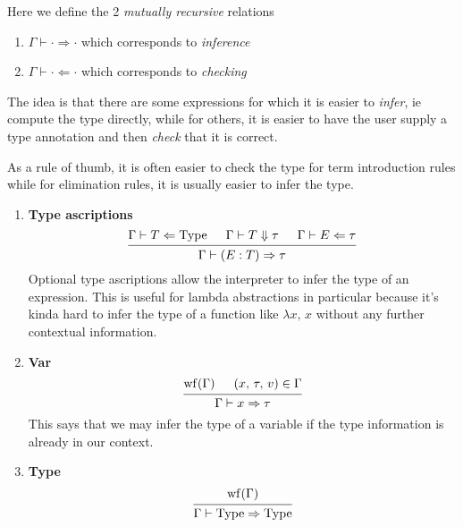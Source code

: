 \documentclass{article}
\begin{document}
\begin{definition} 
  Here we define the 2 \textit{mutually recursive} relations
  \begin{enumerate}
  \item$\Gamma \vdash \cdot \Rightarrow \cdot $ which corresponds to \textit{inference}
  \item$\Gamma \vdash \cdot \Leftarrow \cdot$ which corresponds to \textit{checking}
  \end{enumerate}

  The idea is that there are some expressions for which it is easier to
  \textit{infer},
  ie compute the type directly, while for others, it is easier to have the user
  supply a type annotation and then \textit{check} that it is correct.

  As a rule of thumb, it is often easier to check the type for term
  introduction rules while for elimination rules, it is usually easier to infer
  the type.

  \begin{enumerate}

  \item \textbf{Type ascriptions} \\
    \[
      \begin{prooftree}
        \hypo{\Gamma \vdash T \Leftarrow \Type}
        \hypo{\Gamma \vdash T \Downarrow \tau}
        \hypo{\Gamma \vdash E \Leftarrow \tau}
        \infer3{\Gamma \vdash (E : T) \Rightarrow \tau}
      \end{prooftree}
    \]
   Optional type ascriptions allow the interpreter to infer the type of an
   expression. This is useful for lambda abstractions in particular because it's
   kinda hard to infer the type of a function like $\lambda x, \, x$ without any
   further contextual information.
    
  \item \textbf{Var} \\
    \[
      \begin{prooftree}
        \hypo{\wf(\Gamma)}
        \hypo{(x, \, \tau, \, v) \in \Gamma}
        \infer2{\Gamma \vdash x \Rightarrow \tau}
      \end{prooftree}
    \]
    This says that we may infer the type of a variable if the type information
    is already in our context.

  \item \textbf{Type} \\
    \[
      \begin{prooftree}
        \hypo{\wf(\Gamma)}
        \infer1{\Gamma \vdash \Type \Rightarrow \Type}
      \end{prooftree}
    \]


\end{enumerate}
\end{definition}
\end{document}
